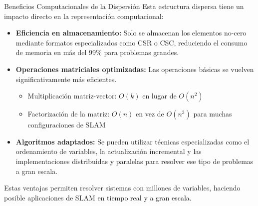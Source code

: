 \documentclass[10pt]{beamer}
\begin{document}
        \begin{frame}{Beneficios Computacionales de la Dispersión}
            Esta estructura dispersa tiene un impacto directo en la representación computacional:
            
            \begin{itemize}
                \item \textbf{Eficiencia en almacenamiento:} Solo se almacenan los elementos no-cero mediante formatos especializados como CSR o CSC, reduciendo el consumo de memoria en más del 99\% para problemas grandes.
                
                \item \textbf{Operaciones matriciales optimizadas:} Las operaciones básicas se vuelven significativamente más eficientes.
                \begin{itemize}
                    \item Multiplicación matriz-vector: $O(k)$ en lugar de $O(n^2)$
                    \item Factorización de la matriz: $O(n)$ en vez de $O(n^3)$ para muchas configuraciones de SLAM
                \end{itemize}
                
                \item \textbf{Algoritmos adaptados:} Se pueden utilizar técnicas especializadas como el ordenamiento de variables, la actualización incremental y las implementaciones distribuidas y paralelas para resolver ese tipo de problemas a gran escala.
            \end{itemize}
            
            Estas ventajas permiten resolver sistemas con millones de variables, haciendo posible aplicaciones de SLAM en tiempo real y a gran escala.
        \end{frame}
\end{document}
